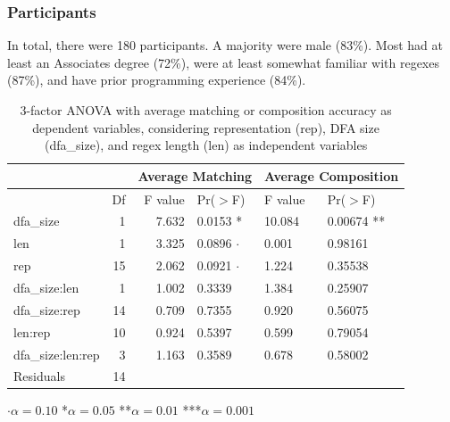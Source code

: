 \subsubsection{Participants}

In total, there were 180 participants.
A majority were male (83\%). %
Most had
at least an Associates degree (72\%), were at least somewhat familiar with regexes (87\%), and have prior programming experience (84\%).





\begin{table}[t]
\centering
\caption{3-factor ANOVA with average matching or composition accuracy as dependent variables, considering representation (rep), DFA size (dfa\_size), and regex length (len) as independent variables}
\begin{tabular}{@{}l@{}r|rl|ll@{}}

  \multicolumn{2}{c}{} & \multicolumn{2}{c}{Average Matching} & \multicolumn{2}{c}{Average Composition} \\
    \hline
 & Df & F value & Pr($>$F) & F value & Pr($>$F) \\
  \hline
dfa\_size &              1 &  7.632 &0.0153 * & 10.084 &0.00674 ** \\
len      &          1 &  3.325 &0.0896 $\cdot$ &  0.001 &0.98161 \\
rep            &      15 &  2.062 &0.0921 $\cdot$ & 1.224 &0.35538\\
dfa\_size:len  &     1 & 1.002 &0.3339  & 1.384 &0.25907   \\
dfa\_size:rep    &     14 & 0.709 &0.7355 &0.920& 0.56075   \\
len:rep     &     10 & 0.924& 0.5397  &  0.599& 0.79054   \\
dfa\_size:len:rep  &3&  1.163& 0.3589 & 0.678 &0.58002   \\
Residuals        &     14&&&&\\
   \hline
\end{tabular}

\vspace{3pt}
$\cdot\alpha = 0.10$ \hspace{3pt} *$\alpha=0.05$ \hspace{3pt} **$\alpha=0.01$ \hspace{3pt} ***$\alpha=0.001$
\label{table:anova}
\end{table}

